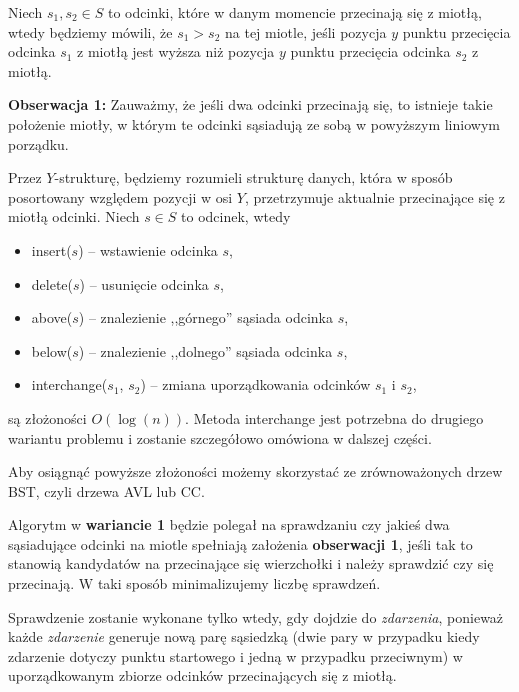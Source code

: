 Niech $s_1, s_2 \in S$ to odcinki, które w danym momencie przecinają się 
z miotłą, wtedy będziemy mówili, że $s_1 > s_2$ na tej miotle,
jeśli pozycja $y$ punktu przecięcia odcinka $s_1$ z miotłą jest wyższa 
niż pozycja $y$ punktu przecięcia odcinka $s_2$ z miotłą.

\textbf{Obserwacja 1:} Zauważmy, że jeśli dwa odcinki przecinają się, to istnieje takie położenie
miotły, w którym te odcinki sąsiadują ze sobą w powyższym liniowym porządku.

Przez $Y$-strukturę, będziemy rozumieli strukturę danych, która w sposób 
posortowany względem pozycji w osi $Y$, przetrzymuje aktualnie przecinające się 
z miotłą odcinki. Niech $s \in S$ to odcinek, wtedy
\begin{itemize}
	\item insert($s$) -- wstawienie odcinka $s$,
	\item delete($s$) -- usunięcie odcinka $s$,
	\item above($s$) -- znalezienie ,,górnego'' sąsiada odcinka $s$,
	\item below($s$) -- znalezienie ,,dolnego'' sąsiada odcinka $s$,
	\item interchange($s_1$, $s_2$) -- zmiana uporządkowania odcinków $s_1$ i $s_2$,
\end{itemize}
są złożoności $O(\log(n))$. Metoda interchange jest potrzebna do drugiego wariantu 
problemu i zostanie szczegółowo omówiona w dalszej części.

Aby osiągnąć powyższe złożoności możemy skorzystać ze zrównoważonych drzew BST, czyli
drzewa AVL lub CC.

Algorytm w \textbf{wariancie 1} będzie polegał na sprawdzaniu 
czy jakieś dwa sąsiadujące odcinki na miotle spełniają założenia 
\textbf{obserwacji 1}, jeśli tak to stanowią kandydatów na przecinające 
się wierzchołki i należy sprawdzić czy się przecinają. W taki sposób
minimalizujemy liczbę sprawdzeń.

Sprawdzenie zostanie wykonane tylko wtedy, gdy dojdzie do \textit{zdarzenia},
ponieważ każde \textit{zdarzenie} generuje nową parę sąsiedzką (dwie pary w przypadku kiedy zdarzenie dotyczy punktu startowego i jedną w przypadku przeciwnym) w uporządkowanym zbiorze odcinków przecinających się z miotłą.

